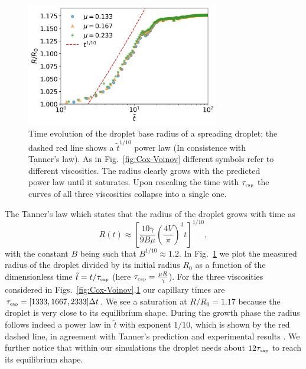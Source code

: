 \begin{figure}
    \centering
    \includegraphics[width=0.75\textwidth]{graphics/Fig_6_Tanners_law_slip_2_paper_rescaled_t.png}
    \caption{Time evolution of the droplet base radius of a spreading droplet; the dashed red line shows a $\tilde{t}^{1/10}$ power law (In consistence with Tanner's law). As in Fig.~\ref{fig:Cox-Voinov} different symbols refer to different viscosities. The radius clearly grows with the predicted power law until it saturates. Upon rescaling the time with $\tau_{\mbox{\tiny{cap}}}$ the curves of all three viscosities collapse into a single one.}
    \label{fig:Tanners_law}
\end{figure}
The Tanner's law which states that the radius of the droplet grows with time as
\begin{equation}
\label{eq:tanners_law}
    R(t)\approx \left[\frac{10\gamma}{9B\mu}\left(\frac{4V}{\pi}\right)^3 t\right]^{1/10},
\end{equation}
with the constant $B$ being such that 
$B^{1/10} \approx 1.2$.  
In Fig.~\ref{fig:Tanners_law} 
we plot the measured radius of the droplet divided by its initial radius $R_0$ as a function of the dimensionless time $\tilde{t} = t/\tau_{\mbox{\tiny{cap}}}$ 
(here $\tau_{\mbox{\tiny{cap}}} = \frac{\mu R}{\gamma}$). For the three viscosities considered 
in Figs.~\ref{fig:Cox-Voinov},\ref{fig:Tanners_law} our capillary times are 
$\tau_{\mbox{\tiny{cap}}} = [1333, 1667, 2333] \Delta t$. 
We see a saturation at $R/R_0=1.17$ because the droplet is very close to 
its equilibrium shape. During the growth phase the radius follows indeed a power law 
in $\tilde{t}$ with exponent $1/10$, which is shown by the red dashed line, in agreement with Tanner's prediction and 
experimental results \cite{rioboo2002time, jambon-puillet_carrier_shahidzadeh_brutin_eggers_bonn_2018, cazabat1986dynamics, CHEN198860}.
We further notice that within our
simulations the droplet needs about $12\tau_{\mbox{\tiny{cap}}}$ to reach its equilibrium shape.


